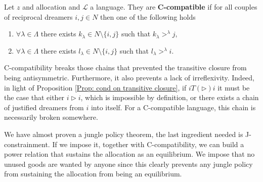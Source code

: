 \begin{definition}
    Let $z$ and allocation and $\mathcal{L}$ a language. They are \textbf{C-compatible} if for all couples of reciprocal dreamers $i,j\in N$ then one of the following holds

    \begin{enumerate}
        \item $\forall \lambda\in \Lambda$ there exists $k_{\lambda}\in N\setminus\{i,j\}$ such that $k_{\lambda}>^{\lambda}j$,
        \item $\forall \lambda\in \Lambda$ there exists $l_{\lambda}\in N\setminus\{i,j\}$ such that $l_{\lambda}>^{\lambda}i$.
    \end{enumerate}
\end{definition}

C-compatibility breaks those chains that prevented the transitive closure from being antisymmetric. Furthermore, it also prevents a lack of irreflexivity. Indeed, in light of Proposition \ref{Prop: cond on transitive closure}, if $iT(\triangleright)i$ it must be the case that either $i\triangleright i$, which is impossible by definition, or there exists a chain of justified dreamers from $i$ into itself. For a C-compatible language, this chain is necessarily broken somewhere. 

We have almost proven a jungle policy theorem, the last ingredient needed is J-constrainment. If we impose it, together with C-compatibility, we can build a power relation that sustains the allocation as an equilibrium. We impose that no unused goods are wanted by anyone since this clearly prevents any jungle policy from sustaining the allocation from being an equilibrium.








